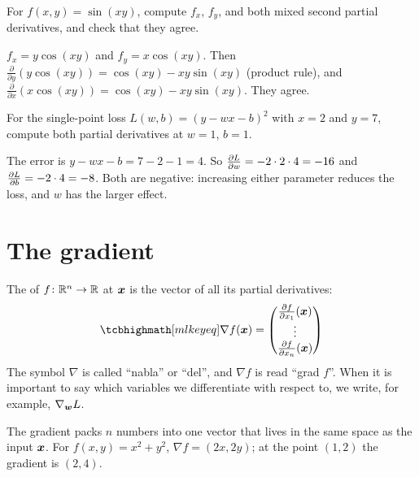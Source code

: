 \begin{exercise}
For $f(x, y) = \sin(xy)$, compute $f_x$, $f_y$, and both mixed second partial
derivatives, and check that they agree.
\end{exercise}
\begin{solution}
$f_x = y\cos(xy)$ and $f_y = x\cos(xy)$. Then
$\tfrac{\partial}{\partial y}(y\cos(xy)) = \cos(xy) - xy\sin(xy)$ (product
rule), and $\tfrac{\partial}{\partial x}(x\cos(xy)) = \cos(xy) - xy\sin(xy)$.
They agree.
\end{solution}

\begin{exercise}
For the single-point loss $L(w, b) = (y - wx - b)^2$ with $x = 2$ and $y = 7$,
compute both partial derivatives at $w = 1$, $b = 1$.
\end{exercise}
\begin{solution}
The error is $y - wx - b = 7 - 2 - 1 = 4$. So $\frac{\partial L}{\partial w} = -2\cdot2\cdot4 =
-16$ and $\frac{\partial L}{\partial b} = -2\cdot4 = -8$. Both are negative: increasing either
parameter reduces the loss, and $w$ has the larger effect.
\end{solution}

\section{The gradient}\label{sec:gradient}

\begin{definition}[Gradient]\label{def:gradient}
The  of $f\colon\mathbb{R}^n\to\mathbb{R}$ at $\bm{x}$ is the vector of all its
partial derivatives:
\[
  \keyeq{\nabla f(\vx) = \begin{pmatrix} \pderiv{f}{x_1}(\vx)\\ \vdots\\
  \pderiv{f}{x_n}(\vx)\end{pmatrix}}
\]
The symbol $\nabla$ is called ``nabla'' or ``del'', and $\nabla f$ is read
``grad $f$''. When it is important to say which variables we differentiate
with respect to, we write, for example, $\nabla_{\bm{w}}L$.
\end{definition}

The gradient packs $n$ numbers into one vector that lives in the same space as
the input $\bm{x}$. For $f(x, y) = x^2 + y^2$, $\nabla f = (2x, 2y)$; at the point
$(1, 2)$ the gradient is $(2, 4)$.

